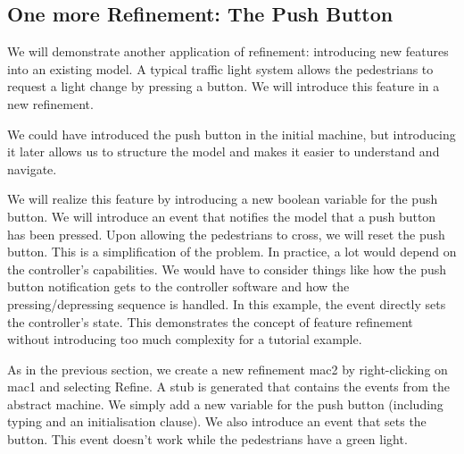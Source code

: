 {\begin{description}
\begin{description}
\begin{description}
			\end{description}
		\Witnesses
			\begin{description}
			\end{description}
		\ThenAct
			\begin{description}
			\nItemX{ act1 }{ cars\_colours :=  new\_value\_colours }
			\end{description}
		\EndAct
		\end{description}
\END
\end{description}
}

\subsection{One more Refinement: The Push Button}
\label{tut_one_more_refinement}

We will demonstrate another application of refinement: introducing new features into an existing model.  A typical traffic light system allows the pedestrians to request a light change by pressing a button.  We will introduce this feature in a new refinement.

We could have introduced the push button in the initial machine, but introducing it later allows us to structure the model and makes it easier to understand and navigate.

We will realize this feature by introducing a new boolean variable for the push button.  We will introduce an event that notifies the model that a push button has been pressed.  Upon allowing the pedestrians to cross, we will reset the push button.  This is a simplification of the problem.  In practice, a lot would depend on the controller's capabilities.  We would have to consider things like how the push button notification gets to the controller software and how the pressing/depressing sequence is handled. In this example, the event directly sets the controller's state.  This demonstrates the concept of feature refinement without introducing too much complexity for a tutorial example.

As in the previous section, we create a new refinement \textsf{mac2} by right-clicking on \textsf{mac1} and selecting \textsf{Refine}.  A stub is generated that contains the events from the abstract machine.  We simply add a new variable for the push button (including typing and an initialisation clause).  We also introduce an event that sets the button.  This event doesn't work while the pedestrians have a green light.

